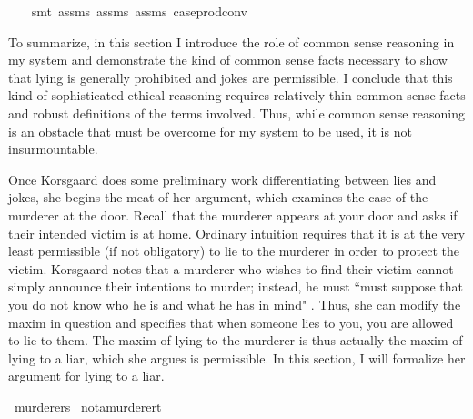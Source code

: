 \begin{isabellebody}
\ \ %
\endisadelimproof
%
\isatagproof
{}\isamarkupfalse%
\ {\isacharparenleft}smt\ assms{\isacharparenleft}{}{\isacharparenright}\ assms{\isacharparenleft}{}{\isacharparenright}\ assms{\isacharparenleft}{}{\isacharparenright}\ case{\isacharunderscore}prod{\isacharunderscore}conv{\isacharparenright}%
\endisatagproof
{\isafoldproof}%
%
\isadelimproof
%
\endisadelimproof
%
\begin{isamarkuptext}%
To summarize, in this section I introduce the role of common sense reasoning in my system and 
demonstrate the kind of common sense facts necessary to show that lying is generally prohibited and 
jokes are permissible. I conclude that this kind of sophisticated ethical reasoning requires relatively
thin common sense facts and robust definitions of the terms involved. Thus, while common sense reasoning 
is an obstacle that must be overcome for my system to be used, it is not insurmountable.%
\end{isamarkuptext}\isamarkuptrue%
%
\isadelimdocument
%
\endisadelimdocument
%
\isatagdocument
%
\isamarkuptrue%
%
\endisatagdocument
{\isafolddocument}%
%
\isadelimdocument
%
\endisadelimdocument
%
\begin{isamarkuptext}%
Once Korsgaard does some preliminary work differentiating between lies and jokes, she begins the 
meat of her argument, which examines the case of the murderer at the door. Recall that the murderer
appears at your door and asks if their intended victim is at home. Ordinary intuition requires that it 
is at the very least permissible (if not obligatory) to lie to the murderer in order to protect the 
victim. Korsgaard notes that a murderer who wishes to find their victim cannot simply announce their
intentions to murder; instead, he must ``must suppose that you do not know who he is and
what he has in mind" \citep[5]{KorsgaaardRTL}. Thus, she can modify the maxim in question and specifies
that when someone lies to you, you are allowed to lie to them. The maxim of lying to the murderer is 
thus actually the maxim of lying to a liar, which she argues is permissible. In this section, I will 
formalize her argument for lying to a liar.%
\end{isamarkuptext}\isamarkuptrue%
\isamarkupfalse%
\ murderer{\isacharcolon}{\isacharcolon}s\isanewline
{}\isamarkupfalse%
\ not{\isacharunderscore}a{\isacharunderscore}murderer{\isacharcolon}{\isacharcolon}t\isanewline
{}\isamarkupfalse%

\end{isabellebody}
